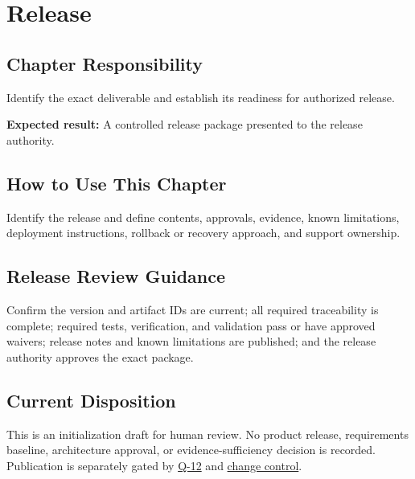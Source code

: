 \chapter{Release}
\section{Chapter Responsibility}
\label{Section:ReleaseResponsibility}
Identify the exact deliverable and establish its readiness for authorized release.

\noindent\textbf{Expected result:} A controlled release package presented to the release authority.

\section{How to Use This Chapter}
Identify the release and define contents, approvals, evidence, known limitations, deployment instructions, rollback or recovery approach, and support ownership.
\section{Release Review Guidance}
Confirm the version and artifact IDs are current; all required traceability is complete; required tests, verification, and validation pass or have approved waivers; release notes and known limitations are published; and the release authority approves the exact package.

\section{Current Disposition}
This is an initialization draft for human review. No product release,
requirements baseline, architecture approval, or evidence-sufficiency decision
is recorded. Publication is separately gated by
\hyperref[Question:Q-12]{Q-12} and \hyperref[Section:ProjectChangeControl]{change control}.
